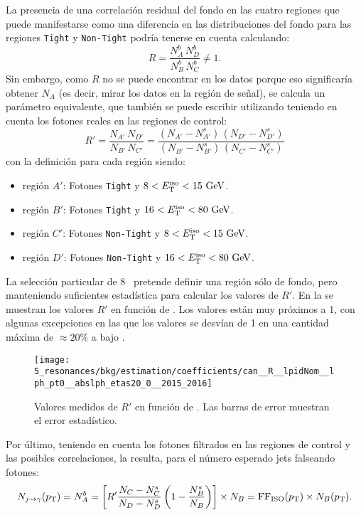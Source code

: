 La presencia de una correlación residual del fondo en las cuatro regiones que puede manifestarse como una diferencia en las distribuciones del fondo para las regiones \texttt{Tight} y \texttt{Non-Tight} podría tenerse en cuenta calculando:
\begin{equation*}
    R = \frac{N^{b}_{A}\,N^{b}_{D}}{N^{b}_{B}\,N^{b}_{C}} \neq 1.
\end{equation*}
Sin embargo, como \(R\) no se puede encontrar en los datos porque eso significaría obtener \(N_A\) (es decir, mirar los datos en la región de se\~nal), se calcula un parámetro equivalente, que también se puede escribir utilizando teniendo en cuenta los fotones reales en las regiones de control:
\begin{equation*}
    R' = \frac{N_{A'}\,N_{D'}}{N_{B'}\,N_{C'}} = \frac{(N_{A'} - N^{s}_{A'})\,(N_{D'}-N^s_{D'})}{(N_{B'}-N^s_{B'})\,(N_{C'}-N^s_{C'})}
\end{equation*}
con la definición para cada región siendo:
\begin{itemize}
    \item región \(A'\): Fotones \texttt{Tight} y \(8 < E_{\text{T}}^{\text{iso}} < 15~ \text{GeV}\).
    \item región \(B'\): Fotones \texttt{Tight} y \(16 < E_{\text{T}}^{\text{iso}} < 80~ \text{GeV}\).
    \item región \(C'\): Fotones \texttt{Non-Tight} y \(8 < E_{\text{T}}^{\text{iso}} < 15~ \text{GeV}\).
    \item región \(D'\): Fotones \texttt{Non-Tight} y \(16 < E_{\text{T}}^{\text{iso}} < 80~ \text{GeV}\).
\end{itemize}
La selección particular de 8 \gev\ pretende definir una región sólo de fondo, pero manteniendo suficientes estadística para calcular los valores de \(R'\). En la \Fig{\ref{fig:bkg:estimation:abcd_corrections:rprime}} se muestran los valores \(R'\) en función de \ptgam.
Los valores están muy próximos a 1, con algunas excepciones en las que los valores se desvían de 1 en una cantidad máxima de \(\approx 20\%\) a bajo \ptgam.
\begin{figure}[htbp]
    \centering
    \texttt{[image: 5\_resonances/bkg/estimation/coefficients/can\_\_R\_\_lpidNom\_\_lph\_pt0\_\_abslph\_etas20\_0\_\_2015\_2016]}
    \caption{Valores medidos de \(R'\) en función de \ptgam. Las barras de error muestran el error estadístico.}
    \label{fig:bkg:estimation:abcd_corrections:rprime}
\end{figure}

Por último, teniendo en cuenta los fotones filtrados en las regiones de control y las posibles correlaciones, la \Eqn{\ref{eq:bkg:estimation:abcd_corrections:njfakes_leak}} resulta, para el número esperado jets falseando fotones:
\begin{equation}
    \label{eq:bkg:estimation:abcd_corrections_ffiso}
    N_{j\rightarrow\gamma}(p_{\text{T}}) =
    N^{b}_{A} =
    \left[R'  \frac{N_{C}-N^{s}_{C}}{N_{D}-N^{s}_{D}}  \left(1 - \frac{N^{s}_{B}}{N_{B}} \right)\right] \times N_B = \text{FF}_{\text{ISO}}(p_{\text{T}})  \times  N_{B}(p_{\text{T}}).
\end{equation}







